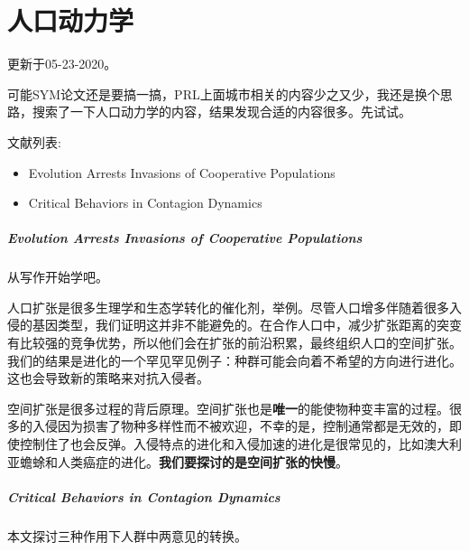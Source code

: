 \chapter{人口动力学}

更新于05-23-2020。

可能SYM论文还是要搞一搞，PRL上面城市相关的内容少之又少，我还是换个思路，搜索了一下人口动力学的内容，结果发现合适的内容很多。先试试。

文献列表:
\begin{itemize}
    \item Evolution Arrests Invasions of Cooperative Populations 
    \item Critical Behaviors in Contagion Dynamics
\end{itemize}

\paragraph{Evolution Arrests Invasions of Cooperative Populations}

从写作开始学吧。

人口扩张是很多生理学和生态学转化的催化剂，举例。尽管人口增多伴随着很多入侵的基因类型，我们证明这并非不能避免的。在合作人口中，减少扩张距离的突变有比较强的竞争优势，所以他们会在扩张的前沿积累，最终组织人口的空间扩张。我们的结果是进化的一个罕见罕见例子：种群可能会向着不希望的方向进行进化。这也会导致新的策略来对抗入侵者。

空间扩张是很多过程的背后原理。空间扩张也是\textbf{唯一}的能使物种变丰富的过程。很多的入侵因为损害了物种多样性而不被欢迎，不幸的是，控制通常都是无效的，即使控制住了也会反弹。入侵特点的进化和入侵加速的进化是很常见的，比如澳大利亚蟾蜍和人类癌症的进化。\textbf{我们要探讨的是空间扩张的快慢}。


\paragraph{Critical Behaviors in Contagion Dynamics}

本文探讨三种作用下人群中两意见的转换。